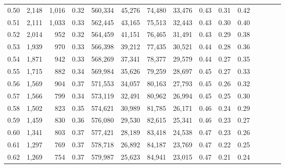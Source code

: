 \begin{tabular}{rrrcrrrrrrrrrrr}
0.50 &   2,148 &  1,016 &                                       0.32 &  560,334 &   45,276 &   74,480 &   33,476 &  0.43 &  0.31 &                         0.42 \\
0.51 &   2,111 &  1,033 &                                       0.33 &  562,445 &   43,165 &   75,513 &   32,443 &  0.43 &  0.30 &                         0.40 \\
0.52 &   2,014 &    952 &                                       0.32 &  564,459 &   41,151 &   76,465 &   31,491 &  0.43 &  0.29 &                         0.38 \\
0.53 &   1,939 &    970 &                                       0.33 &  566,398 &   39,212 &   77,435 &   30,521 &  0.44 &  0.28 &                         0.36 \\
0.54 &   1,871 &    942 &                                       0.33 &  568,269 &   37,341 &   78,377 &   29,579 &  0.44 &  0.27 &                         0.35 \\
0.55 &   1,715 &    882 &                                       0.34 &  569,984 &   35,626 &   79,259 &   28,697 &  0.45 &  0.27 &                         0.33 \\
0.56 &   1,569 &    904 &                                       0.37 &  571,553 &   34,057 &   80,163 &   27,793 &  0.45 &  0.26 &                         0.32 \\
0.57 &   1,566 &    799 &                                       0.34 &  573,119 &   32,491 &   80,962 &   26,994 &  0.45 &  0.25 &                         0.30 \\
0.58 &   1,502 &    823 &                                       0.35 &  574,621 &   30,989 &   81,785 &   26,171 &  0.46 &  0.24 &                         0.29 \\
0.59 &   1,459 &    830 &                                       0.36 &  576,080 &   29,530 &   82,615 &   25,341 &  0.46 &  0.23 &                         0.27 \\
0.60 &   1,341 &    803 &                                       0.37 &  577,421 &   28,189 &   83,418 &   24,538 &  0.47 &  0.23 &                         0.26 \\
0.61 &   1,297 &    769 &                                       0.37 &  578,718 &   26,892 &   84,187 &   23,769 &  0.47 &  0.22 &                         0.25 \\
0.62 &   1,269 &    754 &                                       0.37 &  579,987 &   25,623 &   84,941 &   23,015 &  0.47 &  0.21 &                         0.24 \\

\end{tabular}
